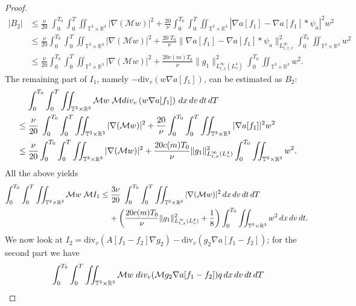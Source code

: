 \documentclass[10pt,a4paper]{amsart}
\newcommand{\R}{\mathbb R}
\newcommand{\T}{\mathbb{T}}
\newcommand{\abs}[1]{\left\vert#1\right\vert}
\newcommand{\dT}{\, {\rm d} T}
\newcommand{\dt}{\, {\rm d} t}
\newcommand{\dv}{\, {\rm d} v}
\newcommand{\dx}{\, {\rm d} x}
\newcommand{\nn}{\nonumber}
\begin{document}
\begin{proof}
\begin{align*}
    |B_2| 
& \leq  
\frac{\nu}{20}\; \int_0^{T_0}\int_0^{T} \iint_{\T^3 \times \R^3}  |\nabla(\mathcal{M} w)|^2 %
+  \frac{20}{\nu} \int_0^{T_0}\int_0^{T} \iint_{\T^3 \times \R^3} 
\abs{\nabla a[f_1]-\nabla a[f_1]\ast \psi_a}^2  w^2   %
\\
&\leq  
\frac{\nu}{20} \int_0^{T_0}\int_0^{T} \iint_{\T^3 \times \R^3}  |\nabla(\mathcal{M} w)|^2 %
+  \frac{20 \;T_0 }{\nu} \| \nabla a[f_1]-\nabla a[f_1]\ast \psi_a\|_{L^\infty_{t,x,v}}^2 \int_0^{T_0} \iint_{\T^3 \times \R^3}   w^2   %
\\
& \leq  
\frac{\nu}{20} \int_0^{T_0}\int_0^{T} \iint_{\T^3 \times \R^3}  
|\nabla(\mathcal{M} w)|^2 %
+  \frac{20 c(m) T_0 }{\nu} \| g_1\|_{L^\infty_{t,x}(L^4_v)}^2 \int_0^{T_0} \iint_{\T^3 \times \R^3}   w^2.   %
\end{align*}
The remaining part of $I_1$, namely $-\textrm{div}_v \left( w \nabla a[f_1]\right)$, can be estimated as $B_2$: 
\begin{align*}
& \quad \,
\int_0^{T_0}\int_0^{T} \iint_{\T^3 \times \R^3} \mathcal{M} w \; \mathcal{M}\textrm{div}_v \left( w \nabla a[f_1]\right) \dx\dv\dt\dT 
\\
& \leq  
\frac{\nu}{20}\; \int_0^{T_0}\int_0^{T} \iint_{\T^3 \times \R^3}  |\nabla(\mathcal{M} w)|^2 %
+  \frac{20}{\nu} \int_0^{T_0}\int_0^{T} \iint_{\T^3 \times \R^3}   
|\nabla a[f_1]|^2  w^2   %
\\
& \leq  
\frac{\nu}{20} \int_0^{T_0}\int_0^{T} \iint_{\T^3 \times \R^3}  
|\nabla(\mathcal{M} w)|^2 %
+  \frac{20 c(m) T_0 }{\nu} \| g_1\|_{L^\infty_{t,x}(L^4_v)}^2 \int_0^{T_0} \iint_{\T^3 \times \R^3}   w^2.  %
\end{align*}
All the above yields 
\begin{align*}
    \int_0^{T_0}\int_0^{T} \iint_{\T^3 \times \R^3} \mathcal{M} w \; \mathcal{M}I_1 %
& \leq  
\frac{3 \nu}{20}\; \int_0^{T_0}\int_0^{T} \iint_{\T^3 \times \R^3}  
|\nabla(\mathcal{M} w)|^2 \dx\dv\dt\dT 
\\
& \quad \,
 + \left( \frac{20 c(m) T_0 }{\nu} \| g_1\|_{L^\infty_{t,x}(L^4_v)}^2 + \frac{1}{8}\right) \int_0^{T_0} \iint_{\T^3 \times \R^3}   w^2   \dx\dv\dt. 
\end{align*}
We now look at $I_2 = \textrm{div}_v \left(A[f_1-f_2]\nabla g_2 \right)- \textrm{div}_v (g_2 \nabla a[f_1-f_2])$; for the second part we have 
\begin{align}
& \quad \, 
\int_0^{T_0} \int_0^{T} \iint_{\T^3 \times \R^3}  \mathcal{M} w \;\textrm{div}_v ( \mathcal{M} g_2 \nabla a[f_1-f_2])q \dx\dv\dt\dT \nn

\end{align}
\end{proof}
\end{document}
